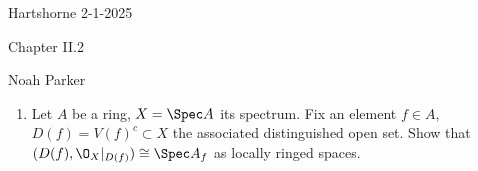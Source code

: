 \documentclass[12pt]{amsart}
\begin{document}
{Hartshorne} \hfill {2-1-2025}

\bigskip\bigskip

\begin{center}

{\sc Chapter II.2}

\end{center}

\begin{center}

  {Noah Parker} 
    
\end{center}

\bigskip

\begin{enumerate}
	\item[2.1.] {
      Let $A$ be a ring, $X=\Spec A$ its spectrum.
      Fix an element $f\in A$, $D(f)=V(f)^c\subset X$ the associated distinguished open set.
      Show that $(D(f),\O_X|_{D(f)})\cong \Spec A_f$ as locally ringed spaces.
    }
\end{enumerate}
\end{document}
